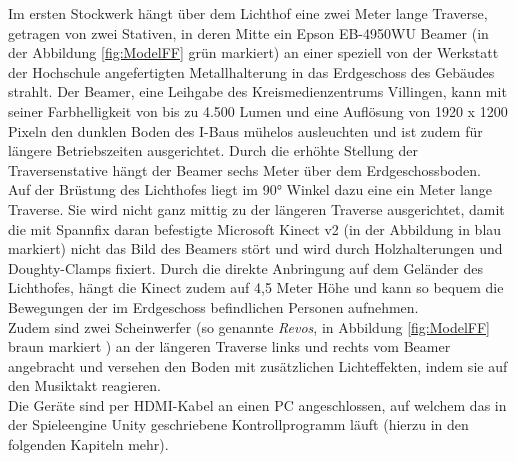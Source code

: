 Im ersten Stockwerk hängt über dem Lichthof eine zwei Meter lange Traverse, getragen von zwei Stativen, in deren Mitte ein Epson EB-4950WU Beamer (in der Abbildung \autoref{fig:ModelFF} grün markiert) an einer speziell von der Werkstatt der Hochschule angefertigten Metallhalterung in das Erdgeschoss des Gebäudes strahlt. Der Beamer, eine Leihgabe des Kreismedienzentrums Villingen, kann mit seiner Farbhelligkeit von bis zu 4.500 Lumen und eine Auflösung von 1920 x 1200 Pixeln den dunklen Boden des I-Baus mühelos ausleuchten und ist zudem für längere Betriebszeiten ausgerichtet. Durch die erhöhte Stellung der Traversenstative hängt der Beamer sechs Meter über dem Erdgeschossboden.\\
Auf der Brüstung des Lichthofes liegt im 90° Winkel dazu eine ein Meter lange Traverse. Sie wird nicht ganz mittig zu der längeren Traverse ausgerichtet, damit die mit Spannfix daran befestigte Microsoft Kinect v2 (in der Abbildung in blau markiert) nicht das Bild des Beamers stört und wird durch Holzhalterungen und Doughty-Clamps fixiert. Durch die direkte Anbringung auf dem Geländer des Lichthofes, hängt die Kinect zudem auf 4,5 Meter Höhe und kann so bequem die Bewegungen der im Erdgeschoss befindlichen Personen aufnehmen.\\
Zudem sind zwei Scheinwerfer (so genannte \textit{Revos}, in Abbildung \autoref{fig:ModelFF} braun markiert ) an der längeren Traverse links und rechts vom Beamer angebracht und versehen den Boden mit zusätzlichen Lichteffekten, indem sie auf den Musiktakt reagieren.\\
Die Geräte sind per HDMI-Kabel an einen PC angeschlossen, auf welchem das in der Spieleengine Unity geschriebene Kontrollprogramm läuft (hierzu in den folgenden Kapiteln mehr).

